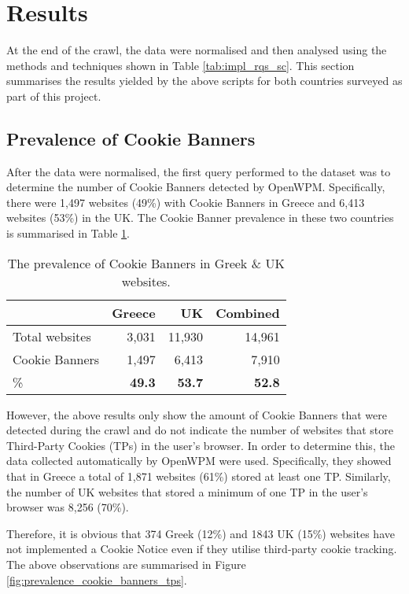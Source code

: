 \documentclass[../main.tex]{subfiles}
\begin{document}
\section{Results}
At the end of the crawl, the data were normalised and then analysed using the methods and techniques shown in Table \ref{tab:impl_rqs_sc}. This section summarises the results yielded by the above scripts for both countries surveyed as part of this project.

\subsection{Prevalence of Cookie Banners}
After the data were normalised, the first query performed to the dataset was to determine the number of Cookie Banners detected by OpenWPM. Specifically, there were 1,497 websites (49\%) with Cookie Banners in Greece and 6,413 websites (53\%) in the UK. The Cookie Banner prevalence in these two countries is summarised in Table \ref{tab:res_cookies_prevalence}.

\begin{table}[ht]
    \centering
    \begin{tabular}{@{}lrrr@{}}
    \toprule
                   & Greece        & UK            & Combined   \\ \midrule
    Total websites & 3,031         & 11,930        & 14,961        \\
    Cookie Banners & 1,497         & 6,413         & 7,910         \\
    \%             & \textbf{49.3} & \textbf{53.7} & \textbf{52.8} \\ \bottomrule
    \end{tabular}
    \caption{The prevalence of Cookie Banners in Greek \& UK websites.}
    \label{tab:res_cookies_prevalence}
\end{table}

However, the above results only show the amount of Cookie Banners that were detected during the crawl and do not indicate the number of websites that store Third-Party Cookies (TPs) in the user’s browser. In order to determine this, the data collected automatically by OpenWPM were used. Specifically, they showed that in Greece a total of 1,871 websites (61\%) stored at least one TP. Similarly, the number of UK websites that stored a minimum of one TP in the user’s browser was 8,256 (70\%).

Therefore, it is obvious that 374 Greek (12\%) and 1843 UK (15\%) websites have not implemented a Cookie Notice even if they utilise third-party cookie tracking. The above observations are summarised in Figure \ref{fig:prevalence_cookie_banners_tps}.
\end{document}
